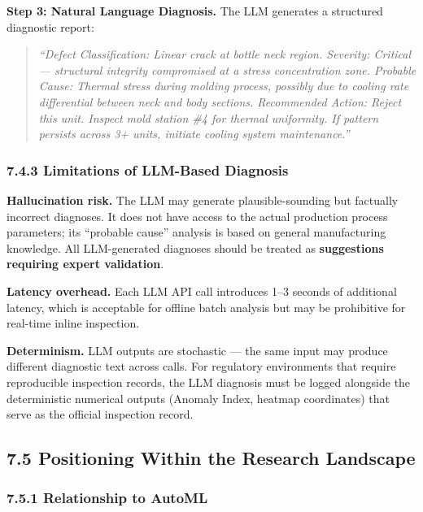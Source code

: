 \documentclass[12pt, a4paper, oneside]{report}
\begin{document}
\textbf{Step 3: Natural Language Diagnosis.} The LLM generates a structured diagnostic report:

\begin{quote}
\emph{``Defect Classification: Linear crack at bottle neck region.\emph{ }Severity: Critical --- structural integrity compromised at a stress concentration zone.\emph{ }Probable Cause: Thermal stress during molding process, possibly due to cooling rate differential between neck and body sections.\emph{ }Recommended Action: Reject this unit. Inspect mold station \#4 for thermal uniformity. If pattern persists across 3+ units, initiate cooling system maintenance.''}
\end{quote}

\subsubsection{7.4.3 Limitations of LLM-Based Diagnosis}\label{limitations-of-llm-based-diagnosis}

\textbf{Hallucination risk.} The LLM may generate plausible-sounding but factually incorrect diagnoses. It does not have access to the actual production process parameters; its ``probable cause'' analysis is based on general manufacturing knowledge. All LLM-generated diagnoses should be treated as \textbf{suggestions requiring expert validation}.

\textbf{Latency overhead.} Each LLM API call introduces 1--3 seconds of additional latency, which is acceptable for offline batch analysis but may be prohibitive for real-time inline inspection.

\textbf{Determinism.} LLM outputs are stochastic --- the same input may produce different diagnostic text across calls. For regulatory environments that require reproducible inspection records, the LLM diagnosis must be logged alongside the deterministic numerical outputs (Anomaly Index, heatmap coordinates) that serve as the official inspection record.

\bigskip\noindent\hrulefill\bigskip

\subsection{7.5 Positioning Within the Research Landscape}\label{positioning-within-the-research-landscape}

\subsubsection{7.5.1 Relationship to AutoML}\label{relationship-to-automl}
\end{document}
